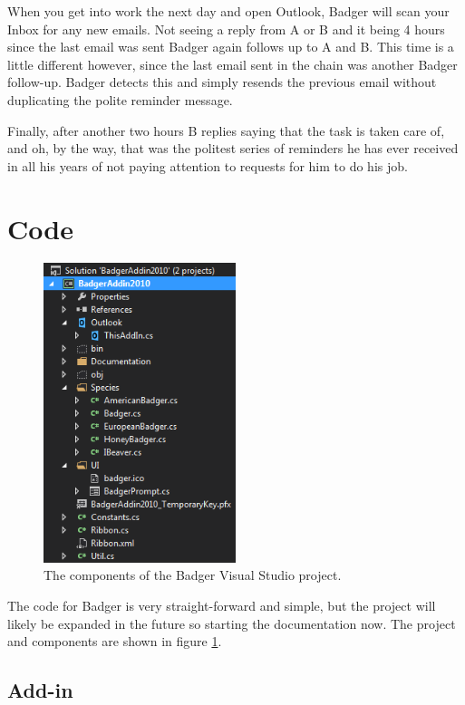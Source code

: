 \documentclass[12pt]{article}
\begin{document}
When you get into work the next day and open Outlook, Badger will scan your Inbox for any new emails. Not seeing a reply from A or B and it being 4 hours since the last email was sent Badger again follows up to A and B. This time is a little different however, since the last email sent in the chain was another Badger follow-up. Badger detects this and simply resends the previous email without duplicating the polite reminder message.

Finally, after another two hours B replies saying that the task is taken care of, and oh, by the way, that was the politest series of reminders he has ever received in all his years of not paying attention to requests for him to do his job.

\section{Code}

\begin{figure}
    \centering
    \includegraphics[width=0.5\textwidth]{vs-project}
    \caption{The components of the Badger Visual Studio project.}
    \label{fig:vs-project}
\end{figure}

The code for Badger is very straight-forward and simple, but the project will likely be expanded in the future so starting the documentation now. The project and components are shown in figure \ref{fig:vs-project}.

\subsection{Add-in}
\end{document}
